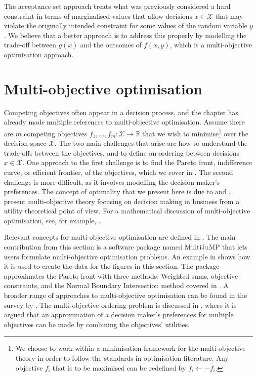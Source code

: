\documentclass[main.tex]{subfiles}
\begin{document}
The acceptance set approach treats what was previously considered a
hard constraint in terms of marginalised values that allow decisions $x\in\mathcal{X}$
that may violate the originally intended constraint for some values of the random
variable $y$. We believe that a better approach is to address this
properly by modelling the trade-off between $g(x)$ and the outcomes of $f(x,y)$,
which is a multi-objective optimisation approach.

\section{Multi-objective optimisation}\label{sec:one_multi-objective}
Competing objectives often appear in a decision process, and the chapter
has already made multiple references to multi-objective optimisation.  Assume
there are $m$ competing objectives
$f_1,\dots,f_m:\mathcal{X}\to\mathbb{R}$ that we wish to
minimise\footnote{We choose to work within a minimisation-framework
  for the multi-objective theory in order to follow the standards in
  optimisation literature. Any objective $f_i$ that is to be maximised
  can be redefined by $f_i\leftarrow -f_i$.} over the decision space
$\mathcal{X}$. The two main challenges that arise are how to understand
the trade-offs between the objectives, and to define an ordering
between decisions $x\in\mathcal{X}$.  One approach to the first
challenge is to find the Pareto front, indifference curve, or efficient
frontier, of the objectives, which we cover in
. The second challenge is more difficult,
as it involves modelling the decision maker's preferences.
The concept of optimality that we present here is due to
\citet{edgeworth1881mathematical} and \citet{pareto1906manuale}.
\citet{keeney1976decisions} present multi-objective theory focusing on
decision making in business from a utility theoretical point of view.
For a mathematical discussion of multi-objective optimisation, see,
for example, \citet{jahn2011vector}.

Relevant concepts for multi-objective optimisation are defined in
.  The main contribution from this section
is a software package named MultiJuMP that lets users formulate
multi-objective optimisation problems.  An example in
 shows how it is used to create the data for
the figures in this section.  The package approximates the Pareto
front with
three methods: Weighted sums, objective
constraints, and the Normal Boundary Intersection method covered in
.  A broader range of
approaches to multi-objective optimisation can be found in the survey
by \citet{marler2004survey}.  The multi-objective ordering problem is
discussed in , where it is argued that an
approximation of a decision maker's preferences for multiple
objectives can be made by combining the objectives' utilities.
\end{document}
